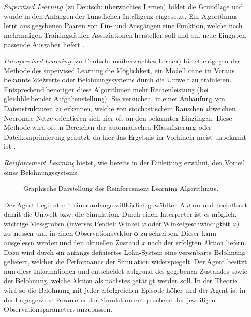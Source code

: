 	\textit{Supervised Learning} (zu Deutsch: überwachtes Lernen) bildet die Grundlage und wurde in den Anfängen der künstlichen Intelligenz eingesetzt. Ein Algorithmus lernt aus gegebenen Paaren von Ein- und Ausgängen eine Funktion, welche nach mehrmaligen Trainingsläufen Assoziationen herstellen soll und auf neue Eingaben passende Ausgaben liefert \cite{DeepLearning}.
	
	\textit{Unsupervised Learning} (zu Deutsch: unüberwachtes Lernen) bietet entgegen der Methode des supervised Learning die Möglichkeit, ein Modell ohne im Voraus bekannte Zielwerte oder Belohnungssysteme durch die Umwelt zu trainieren. Entsprechend benötigen diese Algorithmen mehr Rechenleistung (bei gleichbleibender Aufgabenstellung). Sie versuchen, in einer Anhäufung von Datenstrukturen zu erkennen, welche von stochastischem Rauschen abweichen. Neuronale Netze orientieren sich hier oft an den bekannten Eingängen. Diese Methode wird oft in Bereichen der automatischen Klassifizierung oder Dateikomprimierung genutzt, da hier das Ergebnis im Vorhinein meist unbekannt ist \cite{DeepLearning}.
	
	\textit{Reinforcement Learning} bietet, wie bereits in der Einleitung erwähnt, den Vorteil eines Belohnungssystems.
	\begin{figure}[H] %
		\centering
		\def\svgwidth{12cm}
		
		\caption{Graphische Darstellung des Reinforcement Learning Algorithmus.}
		\label{fig:rl_chart}
	\end{figure}
	Der Agent beginnt mit einer anfangs willkürlich gewählten Aktion und beeinflusst damit die Umwelt bzw. die Simulation. Durch einen Interpreter ist es möglich, wichtige Messgrößen (inverses Pendel: Winkel $\varphi$ oder Winkelgeschwindigkeit $\dot{\varphi}$) zu messen und in einen Observationsvektor $\textbf{o}$ zu schreiben. Dieser kann ausgelesen werden und den aktuellen Zustand $x$ nach der erfolgten Aktion liefern. Dazu wird durch ein anfangs definiertes Lohn-System eine vereinbarte Belohnung geliefert, welcher die Performance der Simulation widerspiegelt. Der Agent besitzt nun diese Informationen und entscheidet aufgrund des gegebenen Zustandes sowie der Belohnung, welche Aktion als nächstes getätigt werden soll. In der Theorie wird so die Belohnung mit jeder erfolgreichen Episode höher und der Agent ist in der Lage gewisse Parameter der Simulation entsprechend des jeweiligen Observationsparameters anzupassen.
	
